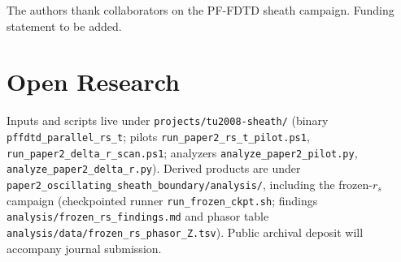 \documentclass[draft]{agujournal2025}
\begin{document}

\acknowledgments
The authors thank collaborators on the PF-FDTD sheath campaign.
Funding statement to be added.

\section*{Open Research}
Inputs and scripts live under \texttt{projects/tu2008-sheath/} (binary \texttt{pffdtd\_parallel\_rs\_t}; pilots \texttt{run\_paper2\_rs\_t\_pilot.ps1}, \texttt{run\_paper2\_delta\_r\_scan.ps1}; analyzers \texttt{analyze\_paper2\_pilot.py}, \texttt{analyze\_paper2\_delta\_r.py}).
Derived products are under \texttt{paper2\_oscillating\_sheath\_boundary/analysis/}, including the frozen-$r_s$ campaign (checkpointed runner \texttt{run\_frozen\_ckpt.sh}; findings \texttt{analysis/frozen\_rs\_findings.md} and phasor table \texttt{analysis/data/frozen\_rs\_phasor\_Z.tsv}).
Public archival deposit will accompany journal submission.


\end{document}
